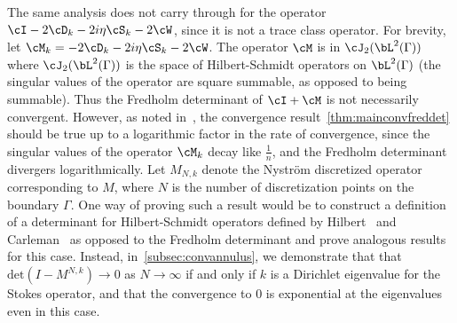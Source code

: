 \begin{remark}
The same analysis does not carry through for the operator
$\cI - 2 \cD_{k} - 2i\eta \cS_{k} - 2\cW$, 
since it is not a trace class operator.
For brevity, let $\cM_{k} = -2\cD_{k} - 2i\eta \cS_{k} - 2\cW$.
The operator $\cM$ is in $\cJ_{2}(\bL^{2}(\Gamma))$ where
$\cJ_{2}(\bL^{2}(\Gamma))$ is the space of Hilbert-Schmidt operators
on $\bL^{2}(\Gamma)$ (the singular values of the operator are square
summable, as opposed to being summable).
Thus the Fredholm determinant of $\cI + \cM$
is not necessarily convergent. 
However, as noted in~\cite{zhao2015robust}, the convergence
result~\cref{thm:mainconvfreddet}
should be true up to a logarithmic factor in the rate
of convergence, since the singular values of the operator
$\cM_{k}$ decay like $\frac{1}{n}$, and the
Fredholm determinant divergers logarithmically. 
Let $M_{N,k}$ denote the Nystr\"{o}m discretized operator 
corresponding to $M$, where $N$ is the number of discretization points
on the boundary $\Gamma$.
One way of proving such a result would be to construct a definition 
of a determinant for Hilbert-Schmidt operators defined by 
Hilbert~\cite{hilbertbook} and Carleman~\cite{carlemanbook}
as opposed to the Fredholm determinant
and prove analogous results for this case.
Instead, in~\cref{subsec:convannulus}, we demonstrate that
that $\text{det} (I - M^{N,k}) \to 0$ as $N \to \infty$ if and only 
if $k$ is a Dirichlet eigenvalue for the Stokes operator, and that
the convergence to $0$ is exponential at the eigenvalues even in 
this case.
\end{remark}

